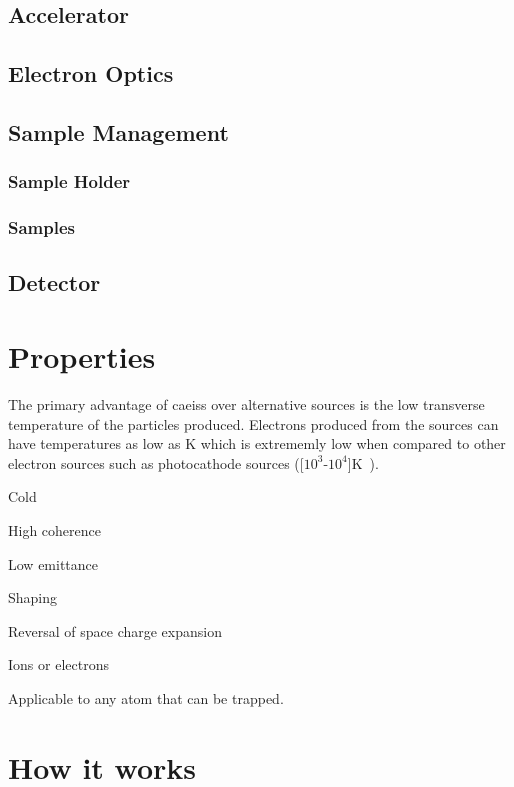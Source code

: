 \subsection{Accelerator}

\subsection{Electron Optics}

\subsection{Sample Management}

\subsubsection{Sample Holder}

\subsubsection{Samples}

\subsection{Detector}

\section{Properties}

The primary advantage of \glspl{caeis} over alternative sources is the low transverse temperature of the particles produced.
Electrons produced from the sources can have temperatures as low as \unit[10]{K} which is extrememly low when compared to other electron sources such as photocathode sources (\unit[$10^3$-$10^4$]{K}~\cite{claessens_ultracold_2005}).

Cold

High coherence

Low emittance

Shaping

Reversal of space charge expansion

Ions or electrons

Applicable to any atom that can be trapped.


\section{How it works}

